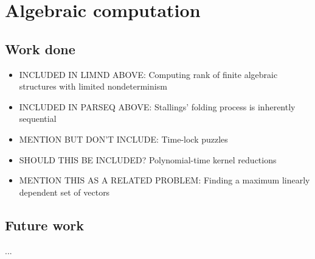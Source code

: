 \documentclass{article}
\begin{document}
\section{Algebraic computation}








%



\subsection{Work done}

\begin{itemize}
\item INCLUDED IN LIMND ABOVE: Computing rank of finite algebraic structures with limited nondeterminism
\item INCLUDED IN PARSEQ ABOVE: Stallings' folding process is inherently sequential
\item MENTION BUT DON'T INCLUDE: Time-lock puzzles
\item SHOULD THIS BE INCLUDED? Polynomial-time kernel reductions
\item MENTION THIS AS A RELATED PROBLEM: Finding a maximum linearly dependent set of vectors
\end{itemize}

\subsection{Future work}

...

\printbibliography
\end{document}
